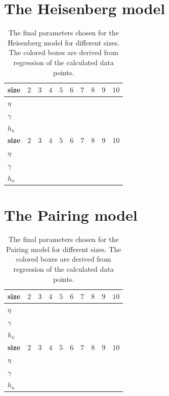 \section{The Heisenberg model}
\begin{table}[H]
  \caption{The final parameters chosen for the Heisenberg model for different sizes. The colored boxes are derived from regression of the calculated data points.}\label{tab:Heisenberg_parameters}
  \begin{center}
    \begin{tabular}{|l|l|l|l|l|l|l|l|l|l|}
      \hline
      \textbf{size} & $2$ &$3$ & $4$& $5$& $6$& $7$&$8$ &$9$ & $10$ \\
      \hline
      $\eta$ & & & & & & & & & \\
      \hline
      $\gamma$ & & & & & & & & &  \\ 
      \hline
      $h_n$ & & & & & & & & & \\
      \hline
      \hline
      \textbf{size} & $2$ &$3$ & $4$& $5$& $6$& $7$&$8$ &$9$ & $10$ \\
      \hline
      $\eta$ & & & & & & & & &   \\
      \hline
      $\gamma$ & & & & & & & & &   \\ 
      \hline
      $h_n$ & & & & & & & & &  \\
      \hline

    \end{tabular}
  \end{center}
\end{table}


\section{The Pairing model}
\begin{table}[H]
  \caption{The final parameters chosen for the Pairing model for different sizes. The colored boxes are derived from regression of the calculated data points.}\label{tab:Pairing_parameters}
  \begin{center}
    \begin{tabular}{|l|l|l|l|l|l|l|l|l|l|}
      \hline
      \textbf{size} & $2$ &$3$ & $4$& $5$& $6$& $7$&$8$ &$9$ & $10$ \\
      \hline
      $\eta$ & & & & & & & & & \\
      \hline
      $\gamma$ & & & & & & & & &  \\ 
      \hline
      $h_n$ & & & & & & & & & \\
      \hline
      \hline
      \textbf{size} & $2$ &$3$ & $4$& $5$& $6$& $7$&$8$ &$9$ & $10$ \\
      \hline
      $\eta$ & & & & & & & & &   \\
      \hline
      $\gamma$ & & & & & & & & &   \\ 
      \hline
      $h_n$ & & & & & & & & &  \\
      \hline

    \end{tabular}
  \end{center}
\end{table}

